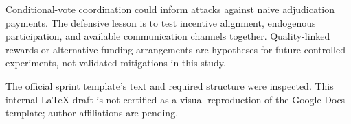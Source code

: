 \documentclass[11pt,letterpaper]{article}
\begin{document}
Conditional-vote coordination could inform attacks against naive adjudication
payments. The defensive lesson is to test incentive alignment, endogenous
participation, and available communication channels together. Quality-linked
rewards or alternative funding arrangements are hypotheses for future
controlled experiments, not validated mitigations in this study.

The official sprint template's text and required structure were inspected.
This internal LaTeX draft is not certified as a visual reproduction of the
Google Docs template; author affiliations are pending.

\clearpage


\clearpage

\end{document}
